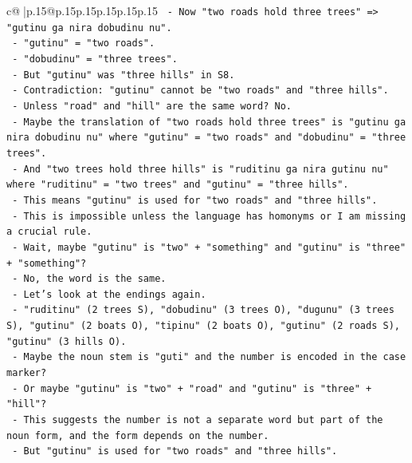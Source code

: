 \documentclass{article}
\begin{document}
{\begin{supertabular}{c@{$\;$}|p{.15\linewidth}@{}p{.15\linewidth}p{.15\linewidth}p{.15\linewidth}p{.15\linewidth}p{.15\linewidth}}
{{{\texttt{                {-} Now "two roads hold three trees" => "gutinu ga nira dobudinu nu".} \\
\texttt{                  {-} "gutinu" = "two roads".} \\
\texttt{                  {-} "dobudinu" = "three trees".} \\
\texttt{                  {-} But "gutinu" was "three hills" in S8.} \\
\texttt{                  {-} Contradiction: "gutinu" cannot be "two roads" and "three hills".} \\
\texttt{                  {-} Unless "road" and "hill" are the same word? No.} \\
\texttt{                  {-} Maybe the translation of "two roads hold three trees" is "gutinu ga nira dobudinu nu" where "gutinu" = "two roads" and "dobudinu" = "three trees".} \\
\texttt{                  {-} And "two trees hold three hills" is "ruditinu ga nira gutinu nu" where "ruditinu" = "two trees" and "gutinu" = "three hills".} \\
\texttt{                  {-} This means "gutinu" is used for "two roads" and "three hills".} \\
\texttt{                  {-} This is impossible unless the language has homonyms or I am missing a crucial rule.} \\
\texttt{                  {-} Wait, maybe "gutinu" is "two" + "something" and "gutinu" is "three" + "something"?} \\
\texttt{                  {-} No, the word is the same.} \\
\texttt{                  {-} Let's look at the endings again.} \\
\texttt{                  {-} "ruditinu" (2 trees S), "dobudinu" (3 trees O), "dugunu" (3 trees S), "gutinu" (2 boats O), "tipinu" (2 boats O), "gutinu" (2 roads S), "gutinu" (3 hills O).} \\
\texttt{                  {-} Maybe the noun stem is "guti" and the number is encoded in the case marker?} \\
\texttt{                  {-} Or maybe "gutinu" is "two" + "road" and "gutinu" is "three" + "hill"?} \\
\texttt{                  {-} This suggests the number is not a separate word but part of the noun form, and the form depends on the number.} \\
\texttt{                  {-} But "gutinu" is used for "two roads" and "three hills".} \\
}}}
\end{supertabular}}
\end{document}
